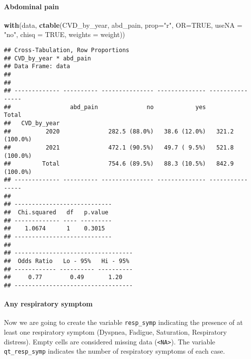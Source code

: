 \documentclass[
]{article}
\newenvironment{Shaded}{\begin{snugshade}}{\end{snugshade}}
\newcommand{\AttributeTok}[1]{\textcolor[rgb]{0.13,0.29,0.53}{#1}}
\newcommand{\ConstantTok}[1]{\textcolor[rgb]{0.56,0.35,0.01}{#1}}
\newcommand{\FunctionTok}[1]{\textcolor[rgb]{0.13,0.29,0.53}{\textbf{#1}}}
\newcommand{\NormalTok}[1]{#1}
\newcommand{\StringTok}[1]{\textcolor[rgb]{0.31,0.60,0.02}{#1}}
\begin{document}
\hypertarget{abdominal-pain-1}{%
\paragraph{\texorpdfstring{{ Abdominal pain
}}{ Abdominal pain }}\label{abdominal-pain-1}}

\begin{Shaded}
\begin{Highlighting}[]
\FunctionTok{with}\NormalTok{(data, }\FunctionTok{ctable}\NormalTok{(CVD\_by\_year, abd\_pain, }\AttributeTok{prop=}\StringTok{"r"}\NormalTok{, }\AttributeTok{OR=}\ConstantTok{TRUE}\NormalTok{, }\AttributeTok{useNA =} \StringTok{"no"}\NormalTok{, }\AttributeTok{chisq =} \ConstantTok{TRUE}\NormalTok{, }\AttributeTok{weights =}\NormalTok{ weight))}
\end{Highlighting}
\end{Shaded}

\begin{verbatim}
## Cross-Tabulation, Row Proportions  
## CVD_by_year * abd_pain  
## Data Frame: data  
## 
## 
## ------------- ---------- --------------- -------------- ----------------
##                 abd_pain              no            yes            Total
##   CVD_by_year                                                           
##          2020              282.5 (88.0%)   38.6 (12.0%)   321.2 (100.0%)
##          2021              472.1 (90.5%)   49.7 ( 9.5%)   521.8 (100.0%)
##         Total              754.6 (89.5%)   88.3 (10.5%)   842.9 (100.0%)
## ------------- ---------- --------------- -------------- ----------------
## 
## ----------------------------
##  Chi.squared   df   p.value 
## ------------- ---- ---------
##    1.0674      1    0.3015  
## ----------------------------
## 
## ----------------------------------
##  Odds Ratio   Lo - 95%   Hi - 95% 
## ------------ ---------- ----------
##     0.77        0.49       1.20   
## ----------------------------------
\end{verbatim}

\hypertarget{any-respiratory-symptom}{%
\paragraph{Any respiratory symptom}\label{any-respiratory-symptom}}

Now we are going to create the variable \texttt{resp\_symp} indicating
the presence of at least one respiratory symptom (Dyspnea, Fadigue,
Saturation, Respiratory distress). Empty cells are considered missing
data (\texttt{\textless{}NA\textgreater{}}). The variable
\texttt{qt\_resp\_symp} indicates the number of respiratory symptoms of
each case.
\end{document}
